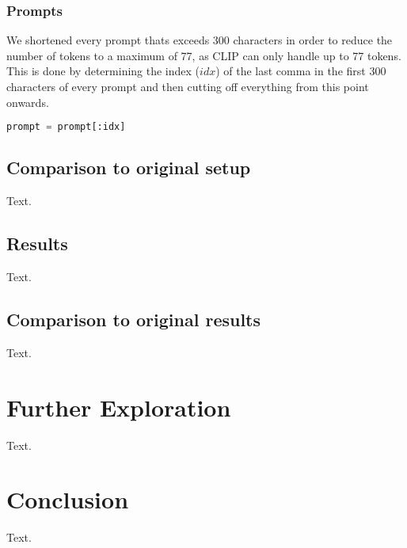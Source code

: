 \documentclass{article}
\begin{document}
\subsubsection*{Prompts}
We shortened every prompt thats exceeds 300 characters in order to reduce the number of tokens to a maximum of 77, as CLIP\cite{radford2021learning} can only handle up to 77 tokens.\\
This is done by determining the index (\(idx\)) of the last comma in the first 300 characters of every prompt and then cutting off everything from this point onwards.
\begin{lstlisting}[language=Python]
prompt = prompt[:idx]
\end{lstlisting}

\subsection{Comparison to original setup}
Text.

\subsection{Results}
Text.

\subsection{Comparison to original results}
Text.




\newpage
\section{Further Exploration}
Text.




\newpage
\section{Conclusion}
Text.





\newpage


\end{document}
